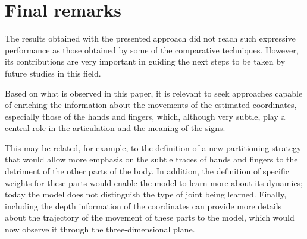 \section{Final remarks} 
\label{sec:final-remarks}

The results obtained with the presented approach did not reach such expressive performance as those obtained by some of the comparative techniques. However, its contributions are very important in guiding the next steps to be taken by future studies in this field.

Based on what is observed in this paper, it is relevant to seek approaches capable of enriching the information about the movements of the estimated coordinates, especially those of the hands and fingers, which, although very subtle, play a central role in the articulation and the meaning of the signs.

This may be related, for example, to the definition of a new partitioning strategy that would allow more emphasis on the subtle traces of hands and fingers to the detriment of the other parts of the body. In addition, the definition of specific weights for these parts would enable the model to learn more about its dynamics; today the model does not distinguish the type of joint being learned. Finally, including the depth information of the coordinates can provide more details about the trajectory of the movement of these parts to the model, which would now observe it through the three-dimensional plane.











